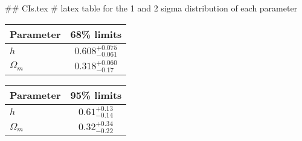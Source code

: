 ## CIs.tex
# latex table for the 1 and 2 sigma distribution of each parameter

\begin{tabular} { l  c}
 Parameter &  68\% limits\\
\hline
{\boldmath$h              $} & $0.608^{+0.075}_{-0.061}   $\\
{\boldmath$\Omega_m       $} & $0.318^{+0.060}_{-0.17}    $\\
\hline
\end{tabular}

\begin{tabular} { l  c}
 Parameter &  95\% limits\\
\hline
{\boldmath$h              $} & $0.61^{+0.13}_{-0.14}      $\\
{\boldmath$\Omega_m       $} & $0.32^{+0.34}_{-0.22}      $\\
\hline
\end{tabular}
